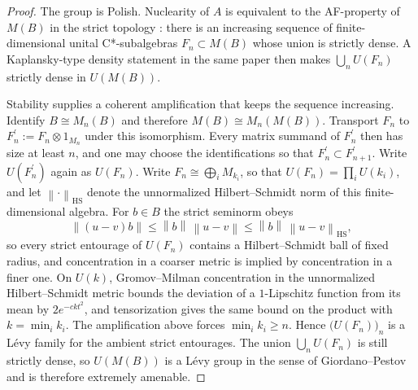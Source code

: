 \begin{proof}
The group is Polish. Nuclearity of $A$ is equivalent to the AF-property of $M(B)$ in the strict topology \cite[Theorem~3.3]{NgRuiz2012}: there is an
increasing sequence of finite-dimensional unital C*-subalgebras $F_n\subset M(B)$ whose union is strictly dense. A Kaplansky-type density
statement in the same paper \cite[Proposition~4.1(vi)]{NgRuiz2012} then makes $\bigcup_n U(F_n)$ strictly dense in $U(M(B))$.

Stability supplies a coherent amplification that keeps the sequence
increasing. Identify $B\cong M_n(B)$ and therefore $M(B)\cong M_n(M(B))$.
Transport $F_n$ to $F_n^{\prime }:=F_n\otimes 1_{M_n}$ under this
isomorphism. Every matrix summand of $F_n^{\prime }$ then has size at least $n$, and one may choose the identifications so that $F_n^{\prime }\subset
F_{n+1}^{\prime }$. Write $U(F_n^{\prime })$ again as $U(F_n)$. Write $F_n\cong\bigoplus_iM_{k_i}$, so that $U(F_n)=\prod_iU(k_i)$, and let $\left\|\cdot\right\|_{\mathrm{HS}}$ denote the unnormalized Hilbert--Schmidt
norm of this finite-dimensional algebra. For $b\in B$ the strict seminorm
obeys 
\begin{equation*}
\left\|(u-v)b\right\|\leq\left\|b\right\|\,\left\|u-v\right\|
\leq\left\|b\right\|\,\left\|u-v\right\|_{\mathrm{HS}},
\end{equation*}
so every strict entourage of $U(F_n)$ contains a Hilbert--Schmidt ball of
fixed radius, and concentration in a coarser metric is implied by
concentration in a finer one. On $U(k)$, Gromov--Milman concentration in the
unnormalized Hilbert--Schmidt metric \cite{GromovMilman1983} bounds the deviation of a $1$-Lipschitz function from its mean by $2e^{-ckt^2}$, and tensorization gives
the same bound on the product with $k=\min_ik_i$. The amplification above
forces $\min_ik_i\geq n$. Hence $\bigl(U(F_n)\bigr)_n$ is a L\'evy family
for the ambient strict entourages. The union $\bigcup_n U(F_n)$ is still
strictly dense, so $U(M(B))$ is a L\'evy group in the sense of
Giordano--Pestov \cite[Section~2]{GiordanoPestov2007} and is therefore extremely amenable.
\end{proof}

